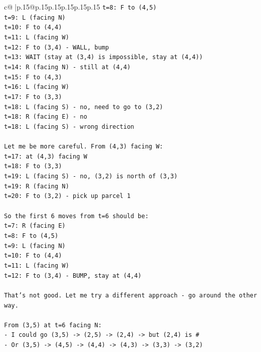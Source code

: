\documentclass{article}
\begin{document}
{\begin{supertabular}{c@{$\;$}|p{.15\linewidth}@{}p{.15\linewidth}p{.15\linewidth}p{.15\linewidth}p{.15\linewidth}p{.15\linewidth}}
{{{\texttt{t=8: F to (4,5)} \\
\texttt{t=9: L (facing N)} \\
\texttt{t=10: F to (4,4)} \\
\texttt{t=11: L (facing W)} \\
\texttt{t=12: F to (3,4) {-} WALL, bump} \\
\texttt{t=13: WAIT (stay at (3,4) is impossible, stay at (4,4))} \\
\texttt{t=14: R (facing N) {-} still at (4,4)} \\
\texttt{t=15: F to (4,3)} \\
\texttt{t=16: L (facing W)} \\
\texttt{t=17: F to (3,3)} \\
\texttt{t=18: L (facing S) {-} no, need to go to (3,2)} \\
\texttt{t=18: R (facing E) {-} no} \\
\texttt{t=18: L (facing S) {-} wrong direction} \\
\\ 
\texttt{Let me be more careful. From (4,3) facing W:} \\
\texttt{t=17: at (4,3) facing W} \\
\texttt{t=18: F to (3,3)} \\
\texttt{t=19: L (facing S) {-} no, (3,2) is north of (3,3)} \\
\texttt{t=19: R (facing N)} \\
\texttt{t=20: F to (3,2) {-} pick up parcel 1} \\
\\ 
\texttt{So the first 6 moves from t=6 should be:} \\
\texttt{t=7: R (facing E)} \\
\texttt{t=8: F to (4,5)} \\
\texttt{t=9: L (facing N)} \\
\texttt{t=10: F to (4,4)} \\
\texttt{t=11: L (facing W)} \\
\texttt{t=12: F to (3,4) {-} BUMP, stay at (4,4)} \\
\\ 
\texttt{That's not good. Let me try a different approach {-} go around the other way.} \\
\\ 
\texttt{From (3,5) at t=6 facing N:} \\
\texttt{{-} I could go (3,5) {-}> (2,5) {-}> (2,4) {-}> but (2,4) is \#} \\
\texttt{{-} Or (3,5) {-}> (4,5) {-}> (4,4) {-}> (4,3) {-}> (3,3) {-}> (3,2)} \\
}}}
\end{supertabular}}
\end{document}
